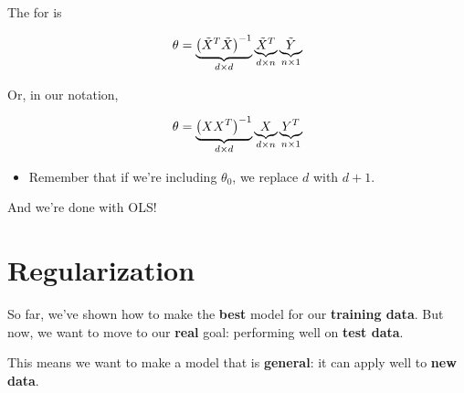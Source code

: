         \begin{kequation}
        
            The  for  is 
            
            \begin{equation*}
                \theta = 
                \underbrace{ 
                \left(  \tilde{X}^T\tilde{X}  \right)  ^{-1}
                }_{d \times d}
                \underbrace{
                \tilde{X}^T
                }_{d \times n}
                \underbrace{
                \tilde{Y}
                }_{n \times 1} 
            \end{equation*}
            
            Or, in our  notation,
            
            \begin{equation*}
                \theta = 
                \underbrace{ 
                \left(  XX^T  \right)  ^{-1}
                }_{d \times d}
                \underbrace{
                X
                }_{d \times n}
                \underbrace{
                Y^T
                }_{n \times 1} 
            \end{equation*}

            \subsecdiv

            \begin{itemize}
                \item Remember that if we're including $\theta_0$, we replace $d$ with $d + 1$.
            \end{itemize}
            
        \end{kequation}
        
    And we're done with OLS!

        
\pagebreak

\section{Regularization}
    
    So far, we've shown how to make the \textbf{best} model for our \textbf{training data}. But now, we want to move to our \textbf{real} goal: performing well on \textbf{test data}.
    
    This means we want to make a model that is \textbf{general}: it can apply well to \textbf{new data}.
    
